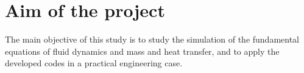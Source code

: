 \section{Aim of the project}
The main objective of this study is to study the simulation of the fundamental equations of fluid dynamics and mass and heat transfer, and to apply the developed codes in a practical engineering case.
